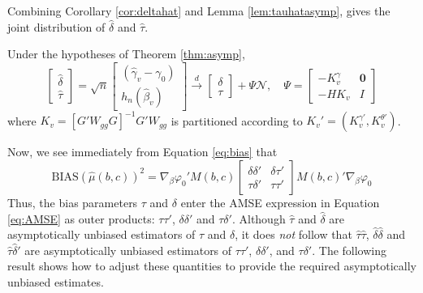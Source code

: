Combining Corollary \ref{cor:deltahat} and Lemma \ref{lem:tauhatasymp}, gives the joint distribution of $\widehat{\delta}$ and $\widehat{\tau}$.

\begin{thm}
\label{thm:jointbias}
Under the hypotheses of Theorem \ref{thm:asymp},
	\[\left[\begin{array}{c}\widehat{\delta}\\ \widehat{\tau}\end{array}\right] = \sqrt{n}\left[\begin{array}{c}\left(\widehat{\gamma}_v-\gamma_0\right)\\h_n(\widehat{\beta}_v)\end{array}\right]
  \overset{d}{\rightarrow} \left[\begin{array}{c}\delta\\ \tau\end{array} \right] +\Psi \mathscr{N}, \quad
  \Psi = \left[\begin{array}{cc} -K_{v}^\gamma&\mathbf{0} \\ -HK_v&I\end{array}\right]
\]
	where $K_v = \left[G'W_{gg}G\right]^{-1}G'W_{gg}$  is partitioned according to $K_v' = (K_v^{\gamma '}, K_v^{\theta '})$.
\end{thm}
Now, we see immediately from Equation \ref{eq:bias} that
$$\mbox{BIAS}\left(\widehat{\mu}\left(b,c\right)\right)^2 = \nabla_\beta \varphi_0' M(b,c) \left[\begin{array}{cc}  \delta \delta'& \delta \tau'\\ \tau \delta'& \tau \tau'\end{array}\right] M(b,c)' \nabla_\beta \varphi_0$$
Thus, the bias parameters $\tau$ and $\delta$ enter the AMSE expression in Equation \ref{eq:AMSE} as outer products: $\tau\tau'$, $\delta\delta'$ and $\tau\delta'$.
Although $\widehat{\tau}$ and $\widehat{\delta}$ are asymptotically unbiased estimators of $\tau$ and $\delta$, it does \emph{not} follow that $\widehat{\tau}\widehat{\tau}$, $\widehat{\delta}\widehat{\delta}$ and $\widehat{\tau}\widehat{\delta}'$ are  asymptotically unbiased estimators of $\tau\tau'$, $\delta\delta'$, and $\tau\delta'$. 
The following result shows how to adjust these quantities to provide the required asymptotically unbiased estimates. 

